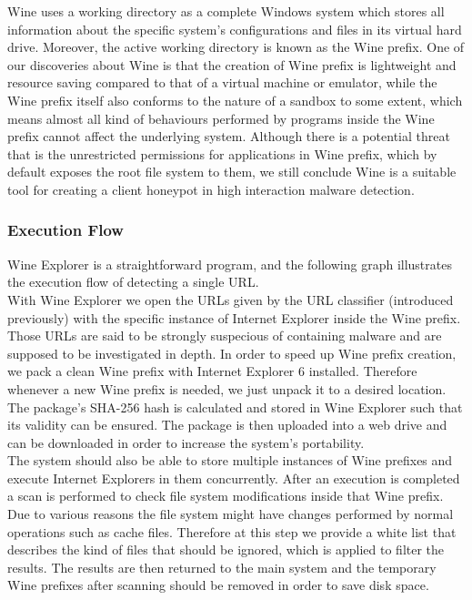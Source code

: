 Wine uses a working directory as a complete Windows system which stores all 
information about the specific system's configurations and files in its virtual 
hard drive. Moreover, the active working directory is known as the Wine prefix. 
One of our discoveries about Wine is that the creation of Wine prefix is 
lightweight and resource saving compared to that of a virtual machine or
emulator, while the Wine prefix itself also conforms to the nature of a 
sandbox to some extent, which means almost all kind of behaviours performed 
by programs inside the Wine prefix cannot affect the underlying system. 
Although there is a potential threat that is the unrestricted permissions 
for applications in Wine prefix, which by default exposes the root file 
system to them, we still conclude Wine is a suitable tool for creating a 
client honeypot in high interaction malware detection. \\

\subsubsection{Execution Flow}
Wine Explorer is a straightforward program, and the following graph 
illustrates the execution flow of detecting a single URL. \\
With Wine Explorer we open the URLs given by the URL classifier (introduced 
previously) with the specific instance of Internet Explorer inside the Wine 
prefix. 
Those URLs are said to be strongly suspecious of containing malware and are 
supposed to be investigated in depth. 
In order to speed up Wine prefix creation, we pack a clean Wine prefix with 
Internet Explorer 6 installed. Therefore whenever a new Wine prefix is needed, 
we just unpack it to a desired location. 
The package's SHA-256 hash is calculated and stored in Wine Explorer such that 
its validity can be ensured. 
The package is then uploaded into a web drive and can be downloaded in 
order to increase the system's portability. \\
The system should also be able to store multiple instances of Wine prefixes 
and execute Internet Explorers in them concurrently. 
After an execution is completed a scan is performed to check file system 
modifications inside that Wine prefix. 
Due to various reasons the file system might have changes performed by normal 
operations such as cache files. 
Therefore at this step we provide a white list that describes the kind of 
files that should be ignored, which is applied to filter the results. 
The results are then returned to the main system and the temporary Wine 
prefixes after scanning should be removed in order to save disk space. 

